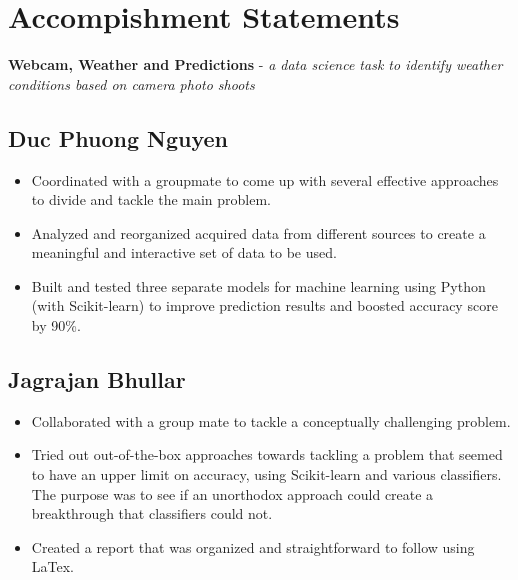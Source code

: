 \newpage

\section{Accompishment Statements}

\textbf{Webcam, Weather and Predictions} - \textit{a data science task to identify weather conditions based on camera photo shoots}

\subsection{Duc Phuong Nguyen}

\begin{itemize}
\item Coordinated with a groupmate to come up with several effective approaches to divide and tackle the main problem.
\item Analyzed and reorganized acquired data from different sources to create a meaningful and interactive set of data to be used.
\item Built and tested three separate models for machine learning using Python (with Scikit-learn) to improve prediction results and boosted accuracy score by 90\%.
\end{itemize}

\subsection{Jagrajan Bhullar}

\begin{itemize}
	\item Collaborated with a group mate to tackle a conceptually challenging problem.
	\item Tried out out-of-the-box approaches towards tackling a problem that seemed to have an upper limit on accuracy, using Scikit-learn and various classifiers. The purpose was to see if an unorthodox approach could create a breakthrough that classifiers could not.
	\item Created a report that was organized and straightforward to follow using LaTex.
\end{itemize}

